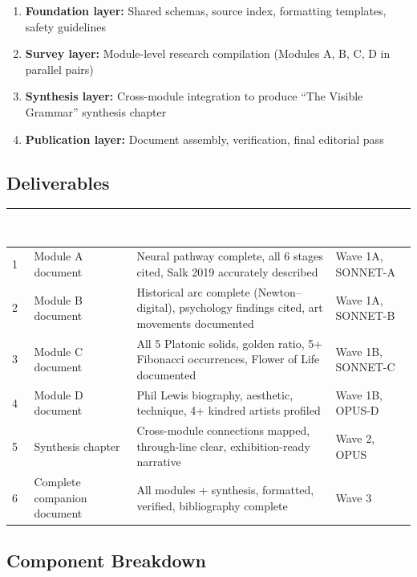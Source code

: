 \documentclass[11pt,letterpaper]{article}
\newcommand{\tableheader}[1]{\textbf{\sffamily\textcolor{white}{#1}}}
\begin{document}
\begin{enumerate}
  \item \textbf{Foundation layer:} Shared schemas, source index, formatting templates, safety guidelines
  \item \textbf{Survey layer:} Module-level research compilation (Modules A, B, C, D in parallel pairs)
  \item \textbf{Synthesis layer:} Cross-module integration to produce ``The Visible Grammar'' synthesis chapter
  \item \textbf{Publication layer:} Document assembly, verification, final editorial pass
\end{enumerate}

\subsection{Deliverables}

\begin{center}
\begin{tabularx}{\textwidth}{C{0.5cm}L{3.5cm}XL{3cm}}
\toprule
{}
\tableheader{\#} & \tableheader{Deliverable} & \tableheader{Acceptance Criteria} & \tableheader{Spec Location} \\
 & Module A document & Neural pathway complete, all 6 stages cited, Salk 2019 accurately described & Wave 1A, SONNET-A \\
2 & Module B document & Historical arc complete (Newton--digital), psychology findings cited, art movements documented & Wave 1A, SONNET-B \\
3 & Module C document & All 5 Platonic solids, golden ratio, 5+ Fibonacci occurrences, Flower of Life documented & Wave 1B, SONNET-C \\
4 & Module D document & Phil Lewis biography, aesthetic, technique, 4+ kindred artists profiled & Wave 1B, OPUS-D \\
5 & Synthesis chapter & Cross-module connections mapped, through-line clear, exhibition-ready narrative & Wave 2, OPUS \\
6 & Complete companion document & All modules + synthesis, formatted, verified, bibliography complete & Wave 3 \\
\bottomrule
\end{tabularx}
\end{center}

\subsection{Component Breakdown}
\end{document}
